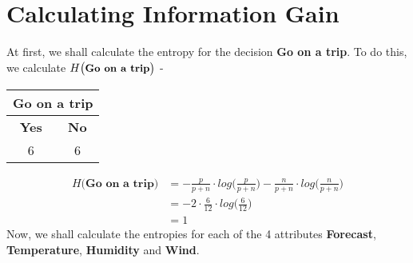 \documentclass[11pt]{article}
\begin{document}
	\section{Calculating Information Gain}
	At first, we shall calculate the entropy for the decision \textbf{Go on a trip}. To do this, we calculate $H \big(\small \textbf{Go on a trip}\big)$ -
	\begin{table}[!ht]
	\centering
	\begin{tabular}{|c|c|}
		\hline
		\multicolumn{2}{|c|}{{\textbf{Go on a trip}}} \\ \hline
		\textbf{Yes}             & \textbf{No}            \\ \hline
		6                        & 6                      \\ \hline
	\end{tabular}
	\end{table}
	\begin{align*}
	H\big(\textbf{Go on a trip}\big) &= - \frac{p}{p + n} \cdot log\bigg(\frac{p}{p + n} \bigg) - \frac{n}{p + n} \cdot log\bigg(\frac{n}{p + n} \bigg) \\
	&= - 2 \cdot \frac{6}{12} \cdot log\bigg(\frac{6}{12}\bigg) \\
	&= 1
	\end{align*}
	Now, we shall calculate the entropies for each of the 4 attributes \textbf{Forecast}, \textbf{Temperature}, \textbf{Humidity} and \textbf{Wind}. 
\end{document}

